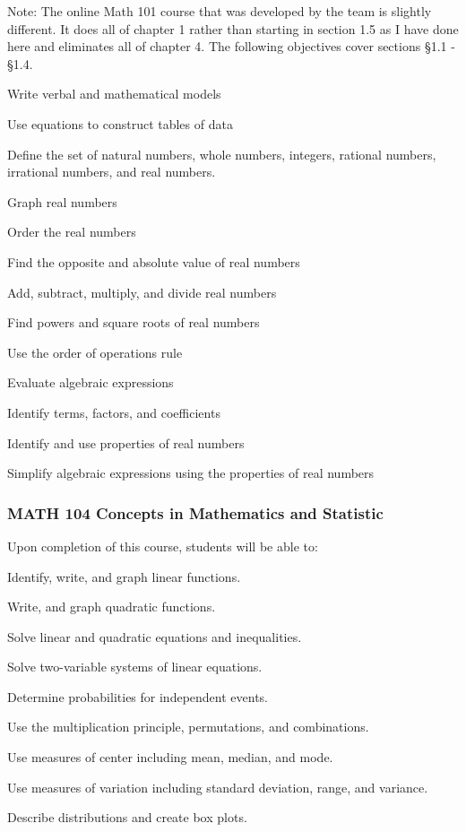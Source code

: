Note: The online Math 101 course that was developed by the team is slightly different.
It does all of chapter 1 rather than starting in section 1.5 as I have done here and eliminates all of chapter 4. 
The following objectives cover sections \S 1.1 - \S 1.4.
 
\begin{alphalist}
    \item Write verbal and mathematical models
    \item Use equations to construct tables of data
    \item Define the set of natural numbers, whole numbers, integers, rational numbers, irrational numbers, and real numbers.
    \item Graph real numbers
    \item Order the real numbers
    \item Find the opposite and absolute value of real numbers
    \item Add, subtract, multiply, and divide real numbers
    \item Find powers and square roots of real numbers
    \item Use the order of operations rule
    \item Evaluate algebraic expressions
    \item Identify terms, factors, and coefficients
    \item Identify and use properties of real numbers
    \item Simplify algebraic expressions using the properties of real numbers

\end{alphalist}



\subsubsection{MATH 104  Concepts in Mathematics and Statistic}


Upon completion of this course, students will be able to:
\begin{alphalist}
    \item Identify, write, and graph linear functions.
    \item Write, and graph quadratic functions.
    \item Solve linear and quadratic equations and inequalities.
    \item Solve two-variable systems of linear equations.
    \item Determine probabilities for independent events.
    \item Use the multiplication principle, permutations, and combinations.
    \item Use measures of center including mean, median, and mode.
    \item Use measures of variation including standard deviation, range, and variance.
    \item Describe distributions and create box plots.
\end{alphalist}


